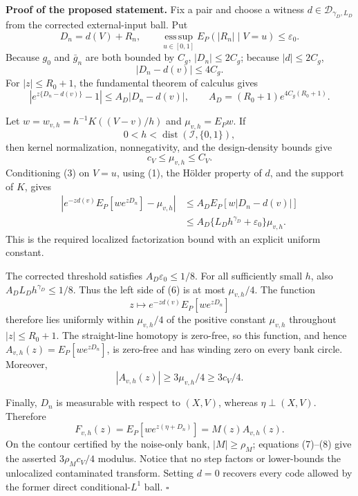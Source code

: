 \textbf{Proof of the proposed statement.}
Fix a pair and choose a witness \(d\in\mathcal D_{\gamma_D,L_D}\) from the corrected external-input ball.  Put
\[
 D_n=d(V)+R_n,\qquad
 \operatorname*{ess\,sup}_{u\in[0,1]}E_P(|R_n|\mid V=u)
 \le\varepsilon_0. \tag{1}
\]
Because \(g_0\) and \(\bar g_n\) are both bounded by \(C_g\),
\(|D_n|\le2C_g\); because \(|d|\le2C_g\),
\[
 |D_n-d(v)|\le4C_g. \tag{2}
\]
For \(|z|\le R_0+1\), the fundamental theorem of calculus gives
\[
 |e^{z\{D_n-d(v)\}}-1|
 \le A_D|D_n-d(v)|,\qquad
 A_D=(R_0+1)e^{4C_g(R_0+1)}. \tag{3}
\]

Let \(w=w_{v,h}=h^{-1}K((V-v)/h)\) and
\(\mu_{v,h}=E_Pw\).  If
\[
 0<h<\operatorname{dist}(\mathcal I,\{0,1\}), \tag{4}
\]
then kernel normalization, nonnegativity, and the design-density bounds give
\[
 c_V\le\mu_{v,h}\le C_V. \tag{5}
\]
Conditioning (3) on \(V=u\), using (1), the Hölder property of \(d\), and the support of \(K\), gives
\[
\begin{aligned}
 \left|e^{-zd(v)}E_P[we^{zD_n}]-\mu_{v,h}\right|
 &\le A_DE_P[w|D_n-d(v)|]\\
 &\le A_D\{L_Dh^{\gamma_D}+\varepsilon_0\}\mu_{v,h}. \tag{6}
\end{aligned}
\]
This is the required localized factorization bound with an explicit uniform constant.

The corrected threshold satisfies \(A_D\varepsilon_0\le1/8\).
For all sufficiently small \(h\), also
\(A_DL_Dh^{\gamma_D}\le1/8\).  Thus the left side of (6) is at most
\(\mu_{v,h}/4\).  The function
\[
 z\longmapsto e^{-zd(v)}E_P[we^{zD_n}]
\]
therefore lies uniformly within \(\mu_{v,h}/4\) of the positive constant
\(\mu_{v,h}\) throughout \(|z|\le R_0+1\).  The straight-line homotopy is zero-free, so this function, and hence
\(A_{v,h}(z)=E_P[we^{zD_n}]\), is zero-free and has winding zero on every bank circle.  Moreover,
\[
 |A_{v,h}(z)|\ge3\mu_{v,h}/4\ge3c_V/4. \tag{7}
\]

Finally, \(D_n\) is measurable with respect to \((X,V)\), whereas
\(\eta\perp(X,V)\).  Therefore
\[
 F_{v,h}(z)=E_P[we^{z(\eta+D_n)}]
 =M(z)A_{v,h}(z). \tag{8}
\]
On the contour certified by the noise-only bank,
\(|M|\ge\rho_M\); equations (7)--(8) give the asserted
\(3\rho_Mc_V/4\) modulus.  Notice that no step factors or lower-bounds the unlocalized contaminated transform.  Setting \(d=0\) recovers every code allowed by the former direct conditional-\(L^1\) ball. \(\square\)